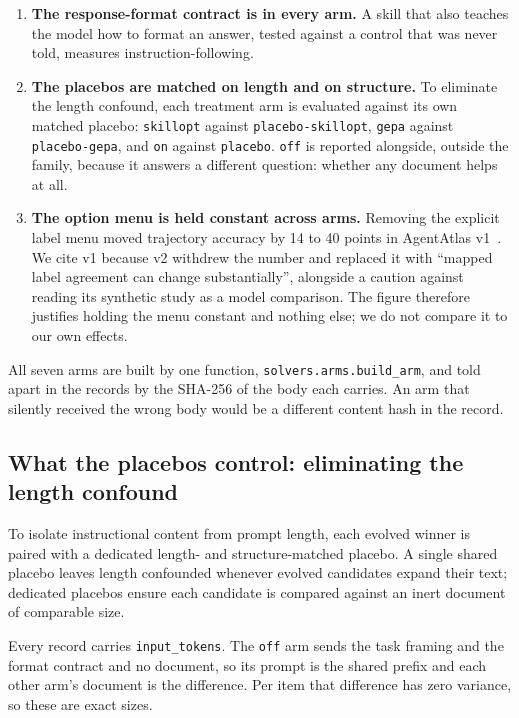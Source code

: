 \begin{enumerate}
  \item \textbf{The response-format contract is in every arm.} A skill that
    also teaches the model how to format an answer, tested against a control
    that was never told, measures instruction-following.
  \item \textbf{The placebos are matched on length and on structure.} To
    eliminate the length confound, each treatment arm is evaluated against its
    own matched placebo: \texttt{skillopt} against \texttt{placebo-skillopt},
    \texttt{gepa} against \texttt{placebo-gepa}, and \texttt{on} against
    \texttt{placebo}. \texttt{off} is reported alongside, outside the family,
    because it answers a different question: whether any document helps at all.
  \item \textbf{The option menu is held constant across arms.} Removing the
    explicit label menu moved trajectory accuracy by 14 to 40 points in
    AgentAtlas v1~\citep{agentatlas2026}. We cite v1 because v2 withdrew the
    number and replaced it with ``mapped label agreement can change
    substantially'', alongside a caution against reading its synthetic study
    as a model comparison. The figure therefore justifies holding the menu
    constant and nothing else; we do not compare it to our own effects.
\end{enumerate}

All seven arms are built by one function, \texttt{solvers.arms.build\_arm}, and
told apart in the records by the SHA-256 of the body each carries. An arm that
silently received the wrong body would be a different content hash in the
record.

\subsection{What the placebos control: eliminating the length confound}
\label{sec:length-confound}

To isolate instructional content from prompt length, each evolved winner is
paired with a dedicated length- and structure-matched placebo. A single shared
placebo leaves length confounded whenever evolved candidates expand their text;
dedicated placebos ensure each candidate is compared against an inert document of
comparable size.

Every record carries \texttt{input\_tokens}. The \texttt{off} arm sends the task
framing and the format contract and no document, so its prompt is the shared
prefix and each other arm's document is the difference. Per item that difference
has zero variance, so these are exact sizes.

